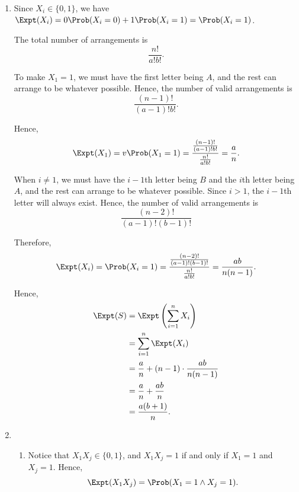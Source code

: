 \Question{\currfilebase}

\begin{enumerate}
    \item Since \(X_i \in \{0, 1\}\), we have \(\Expt(X_i) = 0 \Prob(X_i = 0) + 1 \Prob(X_i = 1) = \Prob(X_i = 1)\).

          The total number of arrangements is
          \[
              \frac{n!}{a!b!}.
          \]

          To make \(X_1 = 1\), we must have the first letter being \(A\), and the rest can arrange to be whatever possible. Hence, the number of valid arrangements is
          \[
              \frac{(n - 1)!}{(a - 1)! b!}.
          \]

          Hence,
          \[
              \Expt(X_1) = v\Prob(X_1 = 1) = \frac{\frac{(n - 1)!}{(a - 1)! b!}}{\frac{n!}{a!b!}} = \frac{a}{n}.
          \]

          When \(i \neq 1\), we must have the \(i - 1\)th letter being \(B\) and the \(i\)th letter being \(A\), and the rest can arrange to be whatever possible. Since \(i > 1\), the \(i - 1\)th letter will always exist. Hence, the number of valid arrangements is
          \[
              \frac{(n - 2)!}{(a - 1)! (b - 1)!}
          \]

          Therefore,
          \[
              \Expt(X_i) = \Prob(X_i = 1) = \frac{\frac{(n - 2)!}{(a - 1)! (b - 1)!}}{\frac{n!}{a!b!}} = \frac{ab}{n (n - 1)}.
          \]

          Hence,
          \begin{align*}
              \Expt(S) & = \Expt\left(\sum_{i = 1}^{n} X_i\right)        \\
                       & = \sum_{i = 1}^{n} \Expt(X_i)                   \\
                       & = \frac{a}{n} + (n - 1) \cdot \frac{ab}{n(n-1)} \\
                       & = \frac{a}{n} + \frac{ab}{n}                    \\
                       & = \frac{a(b + 1)}{n}.
          \end{align*}

    \item \begin{enumerate}
              \item Notice that \(X_1 X_j \in \{0, 1\}\), and \(X_1 X_j = 1\) if and only if \(X_1 = 1\) and \(X_j = 1\). Hence,
                    \[
                        \Expt(X_1 X_j) = \Prob(X_1 = 1 \land X_j = 1).
                    \]


\end{enumerate}
\end{enumerate}
